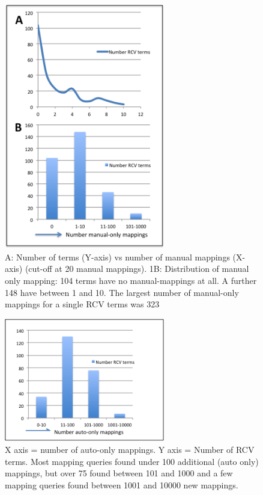 \documentclass[runningheads,a4paper]{llncs}
\begin{document}
{{{\begin{figure}
\centering
\includegraphics[width=70mm]{man_only.png}
\caption{ A: Number of terms (Y-axis) vs number of manual mappings (X-axis) (cut-off at 20 manual mappings). 1B: Distribution of manual only mapping: 104 terms have no manual-mappings at all.  A further 148 have between 1 and 10.  The largest number of manual-only mappings for a single RCV terms was 323}
\label{fig:man_only}
\end{figure}

\begin{figure}
\centering
\includegraphics[width=70mm]{auto_only.png}
\caption{
X axis = number of auto-only mappings.  Y axis = Number of RCV terms.  Most mapping queries found under 100 additional (auto only) mappings, but over 75 found between 101 and 1000 and a few mapping queries found between 1001 and 10000 new mappings.}
\label{fig:auto_only}
\end{figure}

}}}
\end{document}
